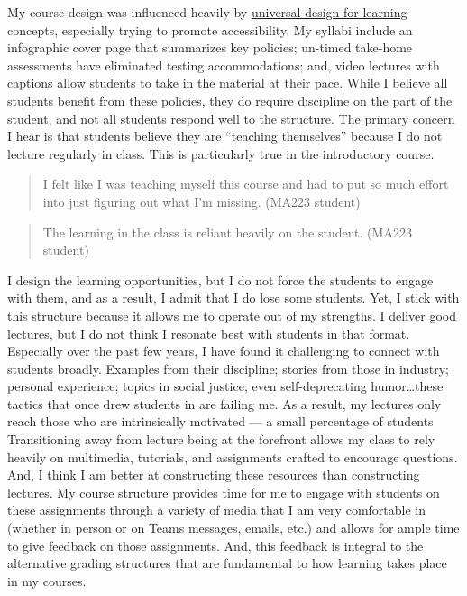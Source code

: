 \documentclass[
  letterpaper,
  DIV=11,
  numbers=noendperiod]{scrreprt}
\begin{document}
My course design was influenced heavily by
\href{https://udlguidelines.cast.org/}{universal design for learning}
concepts, especially trying to promote accessibility. My syllabi include
an infographic cover page that summarizes key policies; un-timed
take-home assessments have eliminated testing accommodations; and, video
lectures with captions allow students to take in the material at their
pace. While I believe all students benefit from these policies, they do
require discipline on the part of the student, and not all students
respond well to the structure. The primary concern I hear is that
students believe they are ``teaching themselves'' because I do not
lecture regularly in class. This is particularly true in the
introductory course.

\begin{quote}
I felt like I was teaching myself this course and had to put so much
effort into just figuring out what I'm missing. (MA223 student)
\end{quote}

\begin{quote}
The learning in the class is reliant heavily on the student. (MA223
student)
\end{quote}

I design the learning opportunities, but I do not force the students to
engage with them, and as a result, I admit that I do lose some students.
Yet, I stick with this structure because it allows me to operate out of
my strengths. I deliver good lectures, but I do not think I resonate
best with students in that format. Especially over the past few years, I
have found it challenging to connect with students broadly. Examples
from their discipline; stories from those in industry; personal
experience; topics in social justice; even self-deprecating
humor\ldots these tactics that once drew students in are failing me. As
a result, my lectures only reach those who are intrinsically motivated
--- a small percentage of students Transitioning away from lecture being
at the forefront allows my class to rely heavily on multimedia,
tutorials, and assignments crafted to encourage questions. And, I think
I am better at constructing these resources than constructing lectures.
My course structure provides time for me to engage with students on
these assignments through a variety of media that I am very comfortable
in (whether in person or on Teams messages, emails, etc.) and allows for
ample time to give feedback on those assignments. And, this feedback is
integral to the alternative grading structures that are fundamental to
how learning takes place in my courses.
\end{document}
